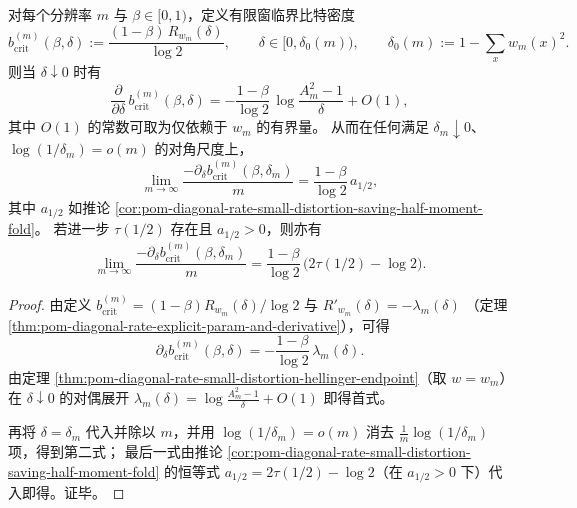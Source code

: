 \begin{corollary}[临界平面的端点斜率：由 \texorpdfstring{$q=\tfrac12$}{q=1/2} 压强反演]\label{cor:pom-query-distortion-critical-slope-inverts-half-pressure}
对每个分辨率 \(m\) 与 \(\beta\in[0,1)\)，定义有限窗临界比特密度
\[
b_{\mathrm{crit}}^{(m)}(\beta,\delta):=\frac{(1-\beta)\,R_{w_m}(\delta)}{\log 2},\qquad \delta\in[0,\delta_0(m)),\qquad \delta_0(m):=1-\sum_x w_m(x)^2.
\]
则当 \(\delta\downarrow 0\) 时有
\[
\frac{\partial}{\partial \delta}\,b_{\mathrm{crit}}^{(m)}(\beta,\delta)
=-\frac{1-\beta}{\log 2}\,\log\frac{A_m^2-1}{\delta}+O(1),
\]
其中 \(O(1)\) 的常数可取为仅依赖于 \(w_m\) 的有界量。
从而在任何满足 \(\delta_m\downarrow 0\)、\(\log(1/\delta_m)=o(m)\) 的对角尺度上，
\[
\lim_{m\to\infty}\frac{-\partial_\delta b_{\mathrm{crit}}^{(m)}(\beta,\delta_m)}{m}
=\frac{1-\beta}{\log 2}\,a_{1/2},
\]
其中 \(a_{1/2}\) 如推论 \ref{cor:pom-diagonal-rate-small-distortion-saving-half-moment-fold}。
若进一步 \(\tau(1/2)\) 存在且 \(a_{1/2}>0\)，则亦有
\[
\lim_{m\to\infty}\frac{-\partial_\delta b_{\mathrm{crit}}^{(m)}(\beta,\delta_m)}{m}
=\frac{1-\beta}{\log 2}\,\bigl(2\tau(1/2)-\log 2\bigr).
\]
\end{corollary}
\begin{proof}
由定义 \(b_{\mathrm{crit}}^{(m)}=(1-\beta)R_{w_m}(\delta)/\log 2\) 与
\(
R'_{w_m}(\delta)=-\lambda_m(\delta)
\)
（定理 \ref{thm:pom-diagonal-rate-explicit-param-and-derivative}），可得
\[
\partial_\delta b_{\mathrm{crit}}^{(m)}(\beta,\delta)
=-\frac{1-\beta}{\log 2}\,\lambda_m(\delta).
\]
由定理 \ref{thm:pom-diagonal-rate-small-distortion-hellinger-endpoint}（取 \(w=w_m\)）在 \(\delta\downarrow 0\) 的对偶展开
\(
\lambda_m(\delta)=\log\frac{A_m^2-1}{\delta}+O(1)
\)
即得首式。
\par
再将 \(\delta=\delta_m\) 代入并除以 \(m\)，并用 \(\log(1/\delta_m)=o(m)\) 消去 \(\frac{1}{m}\log(1/\delta_m)\) 项，得到第二式；
最后一式由推论 \ref{cor:pom-diagonal-rate-small-distortion-saving-half-moment-fold} 的恒等式 \(a_{1/2}=2\tau(1/2)-\log 2\)（在 \(a_{1/2}>0\) 下）代入即得。证毕。
\end{proof}

